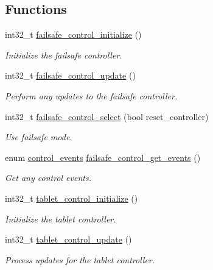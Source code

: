 \subsection*{\-Functions}
\begin{DoxyCompactItemize}
\item 
int32\-\_\-t \hyperlink{group___control_ga7ce4be6cb90b629500ec2db534d375f6}{failsafe\-\_\-control\-\_\-initialize} ()
\begin{DoxyCompactList}\small\item\em \-Initialize the failsafe controller. \end{DoxyCompactList}\item 
int32\-\_\-t \hyperlink{group___control_gab5211c13a168641b8f8aa3df9c8b26c2}{failsafe\-\_\-control\-\_\-update} ()
\begin{DoxyCompactList}\small\item\em \-Perform any updates to the failsafe controller. \end{DoxyCompactList}\item 
int32\-\_\-t \hyperlink{group___control_gad1912458768a13e3fee44acb5992f1d0}{failsafe\-\_\-control\-\_\-select} (bool reset\-\_\-controller)
\begin{DoxyCompactList}\small\item\em \-Use failsafe mode. \end{DoxyCompactList}\item 
enum \hyperlink{group___control_ga6db279174b366abaad3f5de70b10655c}{control\-\_\-events} \hyperlink{group___control_ga4741ee1f75fdb35137c598e00e3fcbae}{failsafe\-\_\-control\-\_\-get\-\_\-events} ()
\begin{DoxyCompactList}\small\item\em \-Get any control events. \end{DoxyCompactList}\item 
int32\-\_\-t \hyperlink{group___control_ga16a2fa9b05e1778d508450239854bdef}{tablet\-\_\-control\-\_\-initialize} ()
\begin{DoxyCompactList}\small\item\em \-Initialize the tablet controller. \end{DoxyCompactList}\item 
int32\-\_\-t \hyperlink{group___control_ga0bee0c81342526c03f10559cf6dbda72}{tablet\-\_\-control\-\_\-update} ()
\begin{DoxyCompactList}\small\item\em \-Process updates for the tablet controller. \end{DoxyCompactList}\item 

\end{DoxyCompactItemize}
